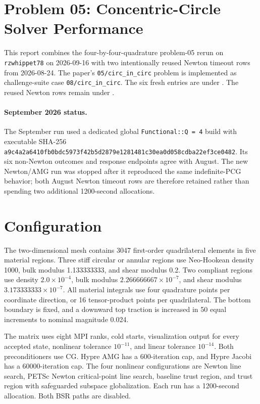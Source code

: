 \documentclass[11pt]{article}
\begin{document}
\sloppy

\section*{Problem 05: Concentric-Circle Solver Performance}

This report combines the four-by-four-quadrature problem-05 rerun on
\texttt{rzwhippet78} on 2026-09-16 with two intentionally reused Newton timeout
rows from 2026-08-24. The paper's
\texttt{05/circ\_in\_circ} problem is implemented as challenge-suite case
\texttt{08/circ\_in\_circ}. The six fresh entries are under
.
The reused Newton rows remain under
.

\paragraph{September 2026 status.}
The September run used a dedicated global \texttt{Functional::Q = 4} build with
executable SHA-256
\texttt{a9c4a2a6410fb0bdc5973f42b5d2879e1281481c30ea0d058cdba22ef3ce0482}.
Its six non-Newton outcomes and response endpoints agree with August. The new
Newton/AMG run was stopped after it reproduced the same indefinite-PCG behavior;
both August Newton timeout rows are therefore retained rather than spending two
additional 1200-second allocations.

\section*{Configuration}

The two-dimensional mesh contains 3047 first-order quadrilateral elements in five
material regions.  Three stiff circular or annular regions use Neo-Hookean density
1000, bulk modulus 1.133333333, and shear modulus 0.2.  Two compliant regions use
density $2.0\times10^{-4}$, bulk modulus $2.266666667\times10^{-7}$, and shear
modulus $3.173333333\times10^{-7}$.  All material integrals use four quadrature
points per coordinate direction, or 16 tensor-product points per quadrilateral.
The bottom boundary is fixed, and a downward top traction is increased in 50 equal
increments to nominal magnitude 0.024.

The matrix uses eight MPI ranks, cold starts, visualization output for every
accepted state, nonlinear tolerance $10^{-11}$, and linear tolerance $10^{-14}$.
Both preconditioners use CG.  Hypre AMG has a 600-iteration cap, and Hypre Jacobi
has a 60000-iteration cap.  The four nonlinear configurations are Newton line
search, PETSc Newton critical-point line search, baseline trust region, and trust
region with safeguarded subspace globalization.  Each run has a 1200-second
allocation.  Both BSR paths are disabled.
\end{document}
